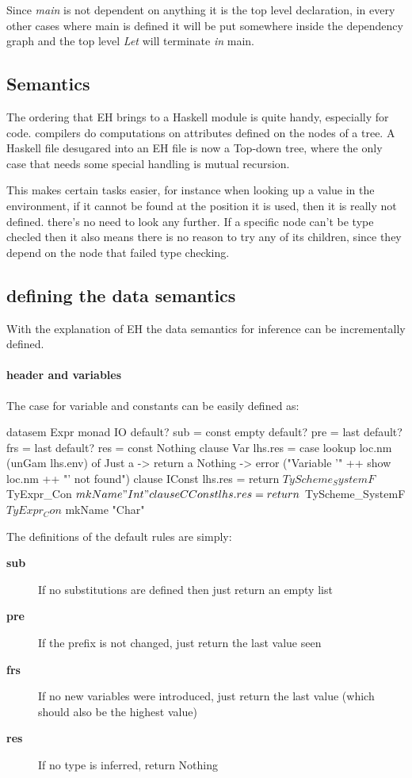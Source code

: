 Since \emph{main} is not dependent on anything it is the top level declaration, in every other cases where main is defined it will be put somewhere inside the dependency graph and the top level \emph{Let} will terminate \emph{in} main.
\subsection{Semantics}

The ordering that EH brings to a Haskell module is quite handy, especially for \ag code. \ag compilers do computations on attributes defined on the nodes of a tree. A Haskell file desugared into an EH file is now a Top-down tree, where the only case that needs some special handling is mutual recursion. 

This makes certain tasks easier, for instance when looking up a value in the environment, if it cannot be found at the position it is used, then it is really not defined. there's no need to look any further. If a specific node can't be type checled then it also means there is no reason to try any of its children, since they depend on the node that failed type checking.

\subsection{defining the data semantics}
With the explanation of EH the data semantics for inference can be incrementally defined.

\paragraph{header and variables}
The case for variable and constants can be easily defined as:
\begin{code}
datasem Expr monad IO
    default? sub = const empty
    default? pre = last
    default? frs = last
    default? res = const Nothing
    clause Var
        lhs.res =
          case lookup loc.nm (unGam lhs.env) of
           Just a  -> return a
           Nothing -> error ("Variable '" ++ show loc.nm ++ "' not found")
    clause IConst
       lhs.res = return $ TyScheme_SystemF $ TyExpr_Con $ mkName "Int"
    clause CConst
       lhs.res = return $ TyScheme_SystemF $ TyExpr_Con $ mkName "Char"
\end{code}

The definitions of the default rules are simply:
\begin{description}
\item[\textbf{sub}] If no substitutions are defined then just return an empty list
\item[\textbf{pre}] If the prefix is not changed, just return the last value seen
\item[\textbf{frs}] If no new variables were introduced, just return the last value (which should also be the highest value)
\item[\textbf{res}] If no type is inferred, return Nothing
\end{description}

